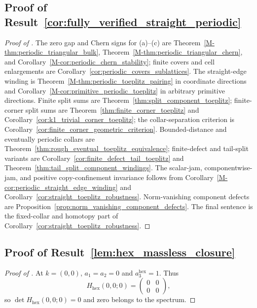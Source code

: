 \documentclass[11pt]{article}
\numberwithin{equation}{section}
\theoremstyle{definition}
\theoremstyle{remark}
\newcommand{\hexagon}{\mathrm{hex}}
\begin{document}
\subsection[Proof of Result~\ref{cor:fully_verified_straight_periodic}]{Proof of Result~\ref{cor:fully_verified_straight_periodic}}\label{app:proof:cor:fully_verified_straight_periodic}
\begin{proof}[Proof of ]
The zero gap and Chern signs for (a)--(c) are Theorem~\ref{M-thm:periodic_triangular_bulk},
Theorem~\ref{M-thm:periodic_triangular_chern}, and
Corollary~\ref{M-cor:periodic_chern_stability}; finite covers and cell enlargements are
Corollary~\ref{cor:periodic_covers_sublattices}. The straight-edge winding is
Theorem~\ref{M-thm:periodic_toeplitz_pairing} in coordinate directions and
Corollary~\ref{M-cor:primitive_periodic_toeplitz} in arbitrary primitive directions. Finite split
sums are Theorem~\ref{thm:split_component_toeplitz}; finite-corner split sums are
Theorem~\ref{thm:finite_corner_toeplitz} and
Corollary~\ref{cor:k1_trivial_corner_toeplitz}; the collar-separation criterion is
Corollary~\ref{cor:finite_corner_geometric_criterion}. Bounded-distance and eventually periodic
collars are Theorem~\ref{thm:rough_eventual_toeplitz_equivalence}; finite-defect and tail-split
variants are Corollary~\ref{cor:finite_defect_tail_toeplitz} and
Theorem~\ref{thm:tail_split_component_windings}. The scalar-jam, componentwise-jam, and positive
copy-confinement invariance follows from Corollary~\ref{M-cor:periodic_straight_edge_winding} and
Corollary~\ref{cor:straight_toeplitz_robustness}. Norm-vanishing component defects are
Proposition~\ref{prop:norm_vanishing_component_defects}. The final sentence is the fixed-collar and
homotopy part of Corollary~\ref{cor:straight_toeplitz_robustness}.
\end{proof}

\subsection{Proof of Result~\ref{lem:hex_massless_closure}}\label{app:proof:lem:hex_massless_closure}
\begin{proof}[Proof of ]
At \(k=(0,0)\), \(a_1=a_2=0\) and \(a_3^{\hexagon}=1\). Thus
\[
H_{\hexagon}(0,0;0)=
\begin{pmatrix}
0&0\\
0&0
\end{pmatrix},
\]
so \(\det H_{\hexagon}(0,0;0)=0\) and zero belongs to the spectrum.
\end{proof}
\end{document}
